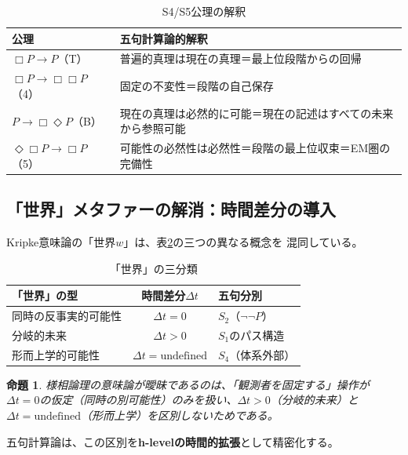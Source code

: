 \documentclass[11pt,a4paper]{ltjsarticle}
\newtheorem{proposition}[definition]{命題}
\theoremstyle{remark}
\begin{document}
\begin{table}[htbp]
\centering
\caption{S4/S5公理の解釈}
\label{tab:s4s5}
\small
\begin{tabularx}{\textwidth}{@{}>{\raggedright\arraybackslash}X >{\raggedright\arraybackslash}X@{}}
\toprule
公理 & 五句計算論的解釈 \\
\midrule
$\Box P\to P$（T） & 普遍的真理は現在の真理＝最上位段階からの回帰 \\
$\Box P\to\Box\Box P$（4） & 固定の不変性＝段階の自己保存 \\
$P\to\Box\Diamond P$（B） & 現在の真理は必然的に可能＝現在の記述はすべての未来から参照可能 \\
$\Diamond\Box P\to\Box P$（5） & 可能性の必然性は必然性＝段階の最上位収束＝EM圏の完備性 \\
\bottomrule
\end{tabularx}
\end{table}

\subsection{「世界」メタファーの解消：時間差分の導入}

Kripke意味論の「世界$w$」は、表\ref{tab:worlds}の三つの異なる概念を
混同している。

\begin{table}[htbp]
\centering
\caption{「世界」の三分類}
\label{tab:worlds}
\small
\begin{tabularx}{\textwidth}{@{}>{\raggedright\arraybackslash}X c >{\raggedright\arraybackslash}X@{}}
\toprule
「世界」の型 & 時間差分$\Delta t$ & 五句分別 \\
\midrule
同時の反事実的可能性 & $\Delta t=0$ & $S_2$（$\neg\neg P$） \\
分岐的未来 & $\Delta t>0$ & $S_1$のパス構造 \\
形而上学的可能性 & $\Delta t=\mathrm{undefined}$ & $S_4$（体系外部） \\
\bottomrule
\end{tabularx}
\end{table}

\begin{proposition}
様相論理の意味論が曖昧であるのは、「観測者を固定する」操作が
$\Delta t=0$の仮定（同時の別可能性）のみを扱い、$\Delta t>0$（分岐的未来）と
$\Delta t=\mathrm{undefined}$（形而上学）を区別しないためである。
\end{proposition}

五句計算論は、この区別を\textbf{h-levelの時間的拡張}として精密化する。
\end{document}
